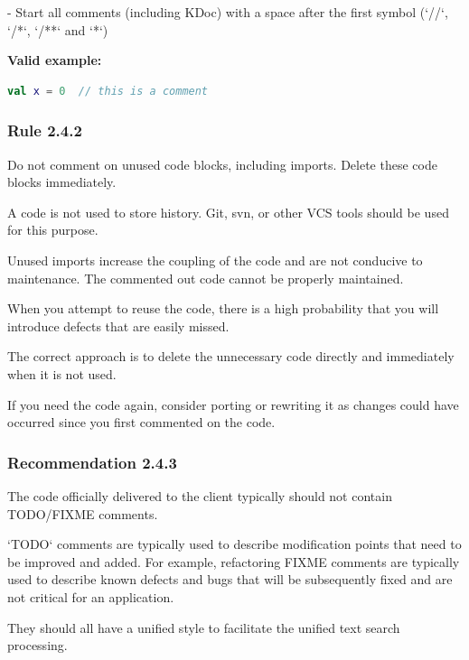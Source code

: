 - Start all comments (including KDoc) with a space after the first symbol (`//`, `/*`, `/**` and `*`)



\textbf{Valid example:}

\begin{lstlisting}[language=Kotlin]
val x = 0  // this is a comment
\end{lstlisting}


\subsubsection*{\textbf{Rule 2.4.2}}
\leavevmode\newline

Do not comment on unused code blocks, including imports. Delete these code blocks immediately.

A code is not used to store history. Git, svn, or other VCS tools should be used for this purpose.

Unused imports increase the coupling of the code and are not conducive to maintenance. The commented out code cannot be properly maintained.

When you attempt to reuse the code, there is a high probability that you will introduce defects that are easily missed.

The correct approach is to delete the unnecessary code directly and immediately when it is not used.

If you need the code again, consider porting or rewriting it as changes could have occurred since you first commented on the code.



\subsubsection*{\textbf{Recommendation 2.4.3}}
\leavevmode\newline

The code officially delivered to the client typically should not contain TODO/FIXME comments.

`TODO` comments are typically used to describe modification points that need to be improved and added. For example, refactoring FIXME comments are typically used to describe known defects and bugs that will be subsequently fixed and are not critical for an application.

They should all have a unified style to facilitate the unified text search processing.



